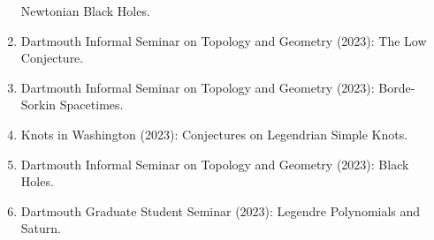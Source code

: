 \documentclass[a4paper,sans]{moderncv}
\begin{document}
\begin{enumerate}
                Newtonian Black Holes.
            \item
                Dartmouth Informal Seminar on Topology and Geometry (2023):
                The Low Conjecture.
            \item
                Dartmouth Informal Seminar on Topology and Geometry (2023):
                Borde-Sorkin Spacetimes.
            \item
                Knots in Washington (2023):
                Conjectures on Legendrian Simple Knots.
            \item
                Dartmouth Informal Seminar on Topology and Geometry (2023):
                Black Holes.
            \item
                Dartmouth Graduate Student Seminar (2023):
                Legendre Polynomials and Saturn.
        \end{enumerate}
\end{document}
